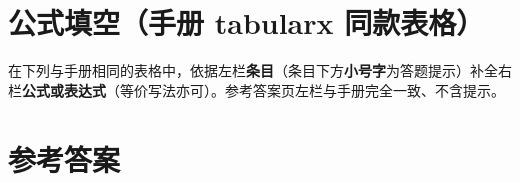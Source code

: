 \documentclass{../paper}
\begin{document}
\section*{公式填空（手册 tabularx 同款表格）}

在下列与手册相同的表格中，依据左栏\textbf{条目}（条目下方\textbf{小号字}为答题提示）补全右栏\textbf{公式或表达式}（等价写法亦可）。参考答案页左栏与手册完全一致、不含提示。

\vspace{0.6em}
\noindent

\clearpage
\section*{参考答案}

\noindent
\end{document}
